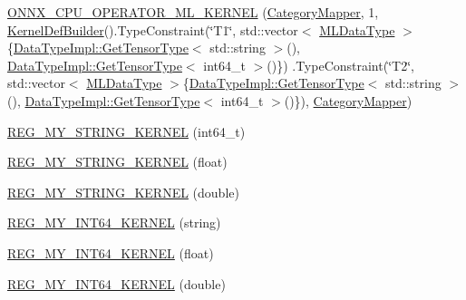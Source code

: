 \begin{DoxyCompactItemize}
\mbox{\hyperlink{namespaceonnxruntime_1_1ml_a104df1138430cd0552e457d9debb1699}{O\+N\+N\+X\+\_\+\+C\+P\+U\+\_\+\+O\+P\+E\+R\+A\+T\+O\+R\+\_\+\+M\+L\+\_\+\+K\+E\+R\+N\+EL}} (\mbox{\hyperlink{classonnxruntime_1_1ml_1_1CategoryMapper}{Category\+Mapper}}, 1, \mbox{\hyperlink{classonnxruntime_1_1KernelDefBuilder}{Kernel\+Def\+Builder}}().Type\+Constraint(\char`\"{}T1\char`\"{}, std\+::vector$<$ \mbox{\hyperlink{namespaceonnxruntime_ad77d0a6e838ec7da5dc35fed5ee66b49}{M\+L\+Data\+Type}} $>$\{\mbox{\hyperlink{classonnxruntime_1_1DataTypeImpl_a7c4a6a7126bc7661eb67af6dfcfad1fb}{Data\+Type\+Impl\+::\+Get\+Tensor\+Type}}$<$ std\+::string $>$(), \mbox{\hyperlink{classonnxruntime_1_1DataTypeImpl_a7c4a6a7126bc7661eb67af6dfcfad1fb}{Data\+Type\+Impl\+::\+Get\+Tensor\+Type}}$<$ int64\+\_\+t $>$()\}) .Type\+Constraint(\char`\"{}T2\char`\"{}, std\+::vector$<$ \mbox{\hyperlink{namespaceonnxruntime_ad77d0a6e838ec7da5dc35fed5ee66b49}{M\+L\+Data\+Type}} $>$\{\mbox{\hyperlink{classonnxruntime_1_1DataTypeImpl_a7c4a6a7126bc7661eb67af6dfcfad1fb}{Data\+Type\+Impl\+::\+Get\+Tensor\+Type}}$<$ std\+::string $>$(), \mbox{\hyperlink{classonnxruntime_1_1DataTypeImpl_a7c4a6a7126bc7661eb67af6dfcfad1fb}{Data\+Type\+Impl\+::\+Get\+Tensor\+Type}}$<$ int64\+\_\+t $>$()\}), \mbox{\hyperlink{classonnxruntime_1_1ml_1_1CategoryMapper}{Category\+Mapper}})
\item 
\mbox{\hyperlink{namespaceonnxruntime_1_1ml_a493e9ffba17d90f9d0f24753de63f411}{R\+E\+G\+\_\+\+M\+Y\+\_\+\+S\+T\+R\+I\+N\+G\+\_\+\+K\+E\+R\+N\+EL}} (int64\+\_\+t)
\item 
\mbox{\hyperlink{namespaceonnxruntime_1_1ml_aab6318d5e3b268c074dcaa233a7573da}{R\+E\+G\+\_\+\+M\+Y\+\_\+\+S\+T\+R\+I\+N\+G\+\_\+\+K\+E\+R\+N\+EL}} (float)
\item 
\mbox{\hyperlink{namespaceonnxruntime_1_1ml_a103c1040f9a30019489fd11e9dc951dc}{R\+E\+G\+\_\+\+M\+Y\+\_\+\+S\+T\+R\+I\+N\+G\+\_\+\+K\+E\+R\+N\+EL}} (double)
\item 
\mbox{\hyperlink{namespaceonnxruntime_1_1ml_af2473f5c9934a4dbe535752cf671bc78}{R\+E\+G\+\_\+\+M\+Y\+\_\+\+I\+N\+T64\+\_\+\+K\+E\+R\+N\+EL}} (string)
\item 
\mbox{\hyperlink{namespaceonnxruntime_1_1ml_a92b9e7d54ae3e5738a345238fb780862}{R\+E\+G\+\_\+\+M\+Y\+\_\+\+I\+N\+T64\+\_\+\+K\+E\+R\+N\+EL}} (float)
\item 
\mbox{\hyperlink{namespaceonnxruntime_1_1ml_a2d5408ae698d884da2be882c7b635380}{R\+E\+G\+\_\+\+M\+Y\+\_\+\+I\+N\+T64\+\_\+\+K\+E\+R\+N\+EL}} (double)
\item 

\end{DoxyCompactItemize}
